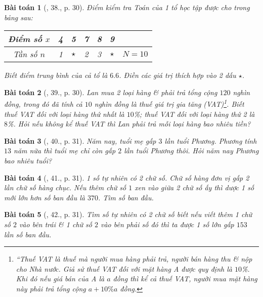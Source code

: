 \documentclass{article}
\newtheorem{baitoan}{Bài toán}
\begin{document}
\begin{baitoan}[\cite{SGK_Toan_8_tap_2}, 38., p. 30]
	Điểm kiểm tra Toán của 1 tổ học tập được cho trong bảng sau:
	\begin{table}[H]
		\centering
		\begin{tabular}{|c|c|c|c|c|c|c|}
			\hline
			Điểm số $x$ & 4 & 5 & 7 & 8 & 9 &  \\
			\hline
			Tần số $n$ & 1 & $\star$ & 2 & 3 & $\star$ & $N = 10$ \\
			\hline
		\end{tabular}
	\end{table}
	Biết điểm trung bình của cả tổ là $6.6$. Điền các giá trị thích hợp vào 2 dấu $\star$.
\end{baitoan}

\begin{baitoan}[\cite{SGK_Toan_8_tap_2}, 39., p. 30]
	Lan mua 2 loại hàng \& phải trả tổng cộng $120$ nghìn đồng, trong đó đã tính cả $10$ nghìn đồng là thuế giá trị gia tăng (VAT)\footnote{``Thuế VAT là thuế mà người mua hàng phải trả, người bán hàng thu \& nộp cho Nhà nước. Giả sử thuế VAT đối với mặt hàng A được quy định là $10$\%. Khi đó nếu giá bán của A là $a$ đồng thì kể cả thuế VAT, người mua mặt hàng này phải trả tổng cộng $a + 10\%a$ đồng.}. Biết thuế VAT đối với loại hàng thứ nhất là $10$\%; thuế VAT đối với loại hàng thứ 2 là $8$\%. Hỏi nếu không kể thuế VAT thì Lan phải trả mỗi loại hàng bao nhiêu tiền?
\end{baitoan}

\begin{baitoan}[\cite{SGK_Toan_8_tap_2}, 40., p. 31]
	Năm nay, tuổi mẹ gấp $3$ lần tuổi Phương. Phương tính $13$ năm nữa thì tuổi mẹ chỉ còn gấp $2$ lần tuổi Phương thôi. Hỏi năm nay Phương bao nhiêu tuổi?
\end{baitoan}

\begin{baitoan}[\cite{SGK_Toan_8_tap_2}, 41., p. 31]
	1 số tự nhiên có 2 chữ số. Chữ số hàng đơn vị gấp 2 lần chữ số hàng chục. Nếu thêm chữ số $1$ xen vào giữa 2 chữ số ấy thì dược 1 số mới lớn hơn số ban đầu là $370$. Tìm số ban đầu.
\end{baitoan}

\begin{baitoan}[\cite{SGK_Toan_8_tap_2}, 42., p. 31]
	Tìm số tự nhiên có 2 chữ số biết nếu viết thêm 1 chữ số $2$ vào bên trái \& 1 chữ số $2$ vào bên phải số đó thì ta được 1 số lớn gấp $153$ lần số ban đầu.
\end{baitoan}
\end{document}
